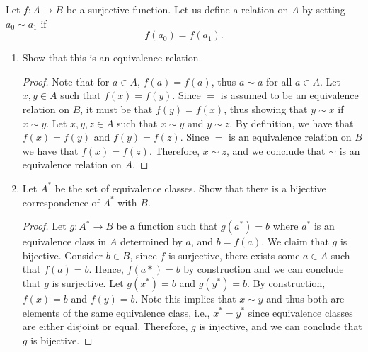 \documentclass[12pt]{article}
\begin{document}
 Let $f: A \to B$ be a surjective function. Let us define a relation on $A$ 
by setting $a_0 \sim a_1$ if 
$$
f(a_0) = f(a_1).
$$ 
\begin{enumerate}[label=(\alph*)]
	\item Show that this is an equivalence relation.
	\begin{proof}
		Note that for $a \in A$, $f(a) = f(a)$, thus $a \sim a$ for all $a \in A$.
		Let $x, y \in A$ such that $f(x) = f(y)$. Since $=$ is assumed to be an equivalence
		relation on $B$, it must be that $f(y) = f(x)$, thus showing that $y \sim x$ if $x \sim y$.
		Let $x, y, z \in A$ such that $x \sim y$ and $y \sim z$. By definition, we have 
		that $f(x) = f(y)$ and $f(y) = f(z)$. Since $=$ is an equivalence relation on $B$ we have
		that $f(x) = f(z)$. Therefore, $x \sim z$, and we conclude that $\sim$ is an equivalence
		relation on $A$.
	\end{proof}
	\item Let $A^*$ be the set of equivalence classes. Show that there is a bijective 
	correspondence of $A^*$ with $B$.
	\begin{proof}
		Let $g: A^* \to B$ be a function such that $g(a^*) = b$ where $a^*$ is an equivalence
		class in $A$ determined by $a$, and $b = f(a)$. We claim that $g$ is bijective. 
		Consider $b \in B$, since $f$ is surjective, there exists some $a \in A$ such
		that $f(a) = b$. Hence, $f(a*) = b$ by construction and we can conclude that 
		$g$ is surjective. Let $g(x^*) = b$ and $g(y^*) = b$. By construction, $f(x) = b$
		and $f(y) = b$. Note this implies that $x \sim y$ and thus both are elements of the 
		same equivalence class, i.e., $x^* = y^*$ since equivalence classes are either disjoint 
		or equal. Therefore, $g$ is injective, and we can conclude that $g$ is bijective. 
	\end{proof}
\end{enumerate}

\pagebreak
\end{document}
